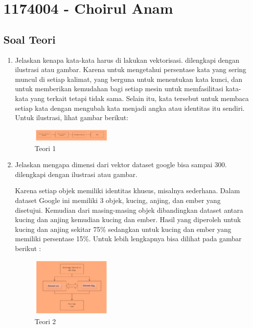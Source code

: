 \section{1174004 - Choirul Anam}
\subsection{Soal Teori}
\begin{enumerate}

	\item Jelaskan kenapa kata-kata harus di lakukan vektorisasi. dilengkapi dengan ilustrasi atau gambar.
	\hfill\break
	Karena untuk mengetahui persentase kata yang sering muncul di setiap kalimat, yang berguna untuk menentukan kata kunci, dan untuk memberikan kemudahan bagi setiap mesin untuk memfasilitasi kata-kata yang terkait tetapi tidak sama. Selain itu, kata tersebut untuk membaca setiap kata dengan mengubah kata menjadi angka atau identitas itu sendiri. Untuk ilustrasi, lihat gambar berikut: 

	\begin{figure}[H]
	\centering
		\includegraphics[width=4cm]{figures/1174004/tugas5/materi/teori1.PNG}
		\caption{Teori 1}
	\end{figure}

	\item Jelaskan mengapa dimensi dari vektor dataset google bisa sampai 300. dilengkapi dengan ilustrasi atau gambar.

	\hfill\break
	Karena setiap objek memiliki identitas khusus, misalnya sederhana. Dalam dataset Google ini memiliki 3 objek, kucing, anjing, dan ember yang disetujui. Kemudian dari masing-masing objek dibandingkan dataset antara kucing dan anjing kemudian kucing dan ember. Hasil yang diperoleh untuk kucing dan anjing sekitar 75\% sedangkan untuk kucing dan ember yang memiliki persentase 15\%. Untuk lebih lengkapnya bisa dilihat pada gambar berikut : 

	\begin{figure}[H]
	\centering
		\includegraphics[width=4cm]{figures/1174004/tugas5/materi/teori2.PNG}
		\caption{Teori 2}
	\end{figure}
	

\end{enumerate}
